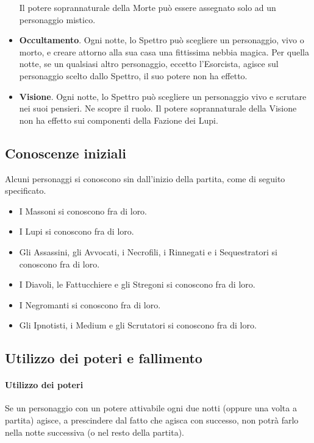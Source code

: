 \documentclass[a4paper,10pt]{article}
\begin{document}
\begin{itemize}
 Il potere soprannaturale della Morte può essere assegnato solo ad un personaggio mistico. %
 
 \item {\bf Occultamento}. Ogni notte, lo Spettro può scegliere un personaggio, vivo o morto, e creare attorno alla sua casa una fittissima nebbia magica. Per quella notte, se un qualsiasi altro personaggio, eccetto l'Esorcista, agisce sul personaggio scelto dallo Spettro, il suo potere non ha effetto.
 
 \item {\bf Visione}. Ogni notte, lo Spettro può scegliere un personaggio vivo e scrutare nei suoi pensieri. Ne scopre il ruolo. Il potere soprannaturale della Visione non ha effetto sui componenti della Fazione dei Lupi.
 
\end{itemize}

\subsection{Conoscenze iniziali}

Alcuni personaggi si conoscono sin dall'inizio della partita, come di seguito specificato.

\begin{itemize}
 \item I Massoni si conoscono fra di loro.
 \item I Lupi si conoscono fra di loro.
 \item Gli Assassini, gli Avvocati, i Necrofili, i Rinnegati e i Sequestratori si conoscono fra di loro.
 \item I Diavoli, le Fattucchiere e gli Stregoni si conoscono fra di loro.
 \item I Negromanti si conoscono fra di loro.
 \item Gli Ipnotisti, i Medium e gli Scrutatori si conoscono fra di loro.
\end{itemize}


\subsection{Utilizzo dei poteri e fallimento}
\label{fallimento}

\paragraph{Utilizzo dei poteri} 
Se un personaggio con un potere attivabile ogni due notti (oppure una volta a partita) agisce, a prescindere dal fatto che agisca con successo, non potrà farlo nella notte successiva (o nel resto della partita).
\end{document}
